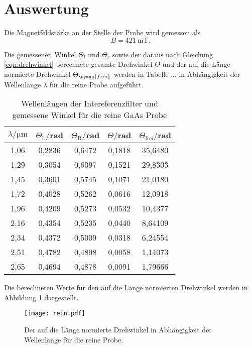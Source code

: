 \section{Auswertung}
\label{sec:Auswertung}

Die Magnetfeldstärke an der Stelle der Probe wird gemessen als
\begin{equation*}
  B = \SI{421}{\milli\tesla}.
\end{equation*}

Die gemessenen Winkel $\Theta_l$ und $\Theta_r$ sowie der daraus nach Gleichung
\ref{eqn:drehwinkel} berechnete gesamte Drehwinkel $\Theta$ und der auf die Länge
normierte Drehwinkel $\Theta_\symup{frei}$ werden in Tabelle ... in Abhängigkeit
der Wellenlänge $\lambda$ für die reine Probe aufgeführt.

\begin{table}[H]
  \centering
  \caption{Wellenlängen der Intereferenzfilter und gemessene Winkel für die reine GaAs Probe}
  \label{tab:Parameter}
  \begin{tabular}{c c c c c}
    \toprule
    $\lambda/\mathrm{\mu m}$ & $\Theta_{\mathrm{L}}/$rad & $\Theta_{\mathrm{R}}/$rad  & $\Theta /$rad & $\Theta_{\mathrm{frei}}/$rad\\
    \midrule
    1,06  & 0,2836 & 0,6472 & 0,1818 & 35,6480 \\
    1,29  & 0,3054 & 0,6097 & 0,1521 & 29,8303 \\
    1,45  & 0,3601 & 0,5745 & 0,1071 & 21,0180 \\
    1,72  & 0,4028 & 0,5262 & 0,0616 & 12,0918 \\
    1,96  & 0,4209 & 0,5273 & 0,0532 & 10,4377 \\
    2,16  & 0,4354 & 0,5235 & 0,0440 & 8,64109 \\
    2,34  & 0,4372 & 0,5009 & 0,0318 & 6,24554 \\
    2,51  & 0,4782 & 0,4898 & 0,0058 & 1,14073 \\
    2,65  & 0,4694 & 0,4878 & 0,0091 & 1,79666 \\
    \bottomrule
  \end{tabular}
\end{table}



Die berechneten Werte für den auf die Länge normierten Drehwinkel werden
in Abbildung \ref{fig:rein} dargestellt.
\begin{figure}[H]
  \centering
  \texttt{[image: rein.pdf]}
  \caption{Der auf die Länge normierte Drehwinkel in Abhängigkeit der Wellenlänge für die reine Probe.}
  \label{fig:rein}
\end{figure}

